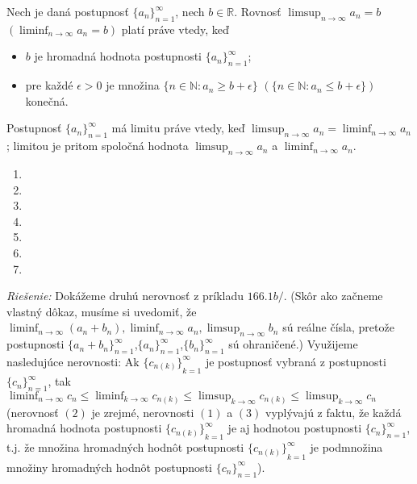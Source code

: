 \begin{veta}
Nech je daná postupnosť ${\{a_n\}}_{n=1}^\infty$, nech $b \in \mathbb{R}$. Rovnosť $\limsup_{n \rightarrow \infty} a_n =b$  $(\liminf_{n \rightarrow \infty} a_n =b)$ platí práve vtedy, keď
\begin{itemize}
\item $b$ je hromadná hodnota postupnosti ${\{a_n\}}_{n=1}^\infty$;
\item pre každé $\epsilon > 0$ je množina $\{ n \in \mathbb{N}: a_n \geq b +\epsilon \}$  $(\{  n \in \mathbb{N}: a_n \leq b +\epsilon \} )$ konečná.
\end{itemize}
\end{veta}

\begin{veta}
Postupnosť ${\{a_n\}}_{n=1}^\infty$ má limitu práve vtedy, keď $\limsup_{n \rightarrow \infty} a_n = \liminf_{n \rightarrow \infty} a_n$; limitou je pritom spoločná hodnota $\limsup_{n \rightarrow \infty} a_n$ a $\liminf_{n \rightarrow \infty} a_n$.
\end{veta}

\begin{enumerate}[resume]
  \item {}
  \item {}
  \item {}
  \item {}
  \item {}
  \item {}
  \item {}
\end{enumerate}

\textit{Riešenie:}
Dokážeme druhú nerovnosť z príkladu $166.1b/$. (Skôr ako začneme vlastný dôkaz, musíme si uvedomiť, že $\liminf_{n \rightarrow \infty} (a_n+b_n),\liminf_{n \rightarrow \infty} a_n, \limsup_{n \rightarrow \infty} b_n$ sú reálne čísla, pretože postupnosti ${\{a_n+b_n\}}_{n=1}^\infty$,${\{a_n\}}_{n=1}^\infty$,${\{b_n\}}_{n=1}^\infty$ sú ohraničené.) Využijeme nasledujúce nerovnosti:
Ak ${\{c_{n(k)}\}}_{k=1}^\infty$ je postupnosť vybraná z postupnosti ${\{c_n\}}_{n=1}^\infty$, tak $\liminf_{n \rightarrow \infty} c_n \leq \liminf_{k \rightarrow \infty} c_{n(k)} \leq \limsup_{k \rightarrow \infty}c_{n(k)}\leq \limsup_{k \rightarrow \infty} c_n$
(nerovnosť $(2)$ je zrejmé, nerovnosti $(1)$ a $(3)$ vyplývajú z faktu, že každá hromadná hodnota postupnosti ${\{c_{n(k)}\}}_{k=1}^\infty$ je aj hodnotou postupnosti ${\{c_n\}}_{n=1}^\infty$, t.j. že množina hromadných hodnôt postupnosti ${\{c_{n(k)}\}}_{k=1}^\infty$ je podmnožina množiny hromadných hodnôt postupnosti ${\{c_n\}}_{n=1}^\infty$).


